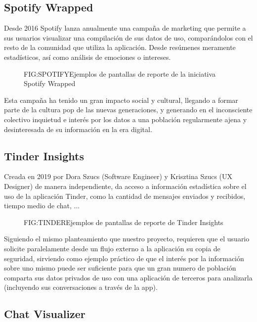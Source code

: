 
\subsection{Spotify Wrapped}

Desde 2016 Spotify lanza anualmente una campaña de marketing que permite a sus usuarios visualizar una compilación de sus datos de uso, comparándolos con el resto de la comunidad que utiliza la aplicación. Desde resúmenes meramente estadísticos, así como análisis de emociones o intereses.

\begin{figure}[Spotify Wrapped]{FIG:SPOTIFY}{Ejemplos de pantallas de reporte de la iniciativa Spotify Wrapped}
\end{figure}

Esta campaña ha tenido un gran impacto social y cultural, llegando a formar parte de la cultura pop de las nuevas generaciones, y generando en el inconsciente colectivo inquietud e interés por los datos a una población regularmente ajena y desinteresada de su información en la era digital.

\newpage

\subsection{Tinder Insights}

Creada en 2019 por Dora Szucs (Software Engineer) y Krisztina Szucs (UX Designer) de manera independiente, da acceso a información estadística sobre el uso de la aplicación Tinder, como la cantidad de mensajes enviados y recibidos, tiempo medio de chat, ...

\begin{figure}[Tinder Insights]{FIG:TINDER}{Ejemplos de pantallas de reporte de Tinder Insights}
\end{figure}

Siguiendo el mismo planteamiento que nuestro proyecto, requieren que el usuario solicite paralelamente desde un flujo externo a la aplicación su copia de seguridad, sirviendo como ejemplo práctico de que el interés por la información sobre uno mismo puede ser suficiente para que un gran numero de población comparta sus datos privados de uso con una aplicación de terceros para analizarla (incluyendo sus conversaciones a través de la app).

\newpage

\subsection{Chat Visualizer}

